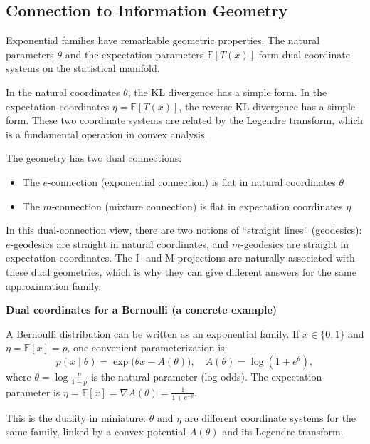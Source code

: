 \subsection{Connection to Information Geometry}

Exponential families have remarkable geometric properties. The natural parameters $\theta$ and the expectation parameters $\mathbb{E}[T(x)]$ form dual coordinate systems on the statistical manifold.

In the natural coordinates $\theta$, the KL divergence has a simple form. In the expectation coordinates $\eta = \mathbb{E}[T(x)]$, the reverse KL divergence has a simple form. These two coordinate systems are related by the Legendre transform, which is a fundamental operation in convex analysis.

\vspace{1em}

The geometry has two dual connections:

\begin{itemize}
\item The $e$-connection (exponential connection) is flat in natural coordinates $\theta$

\item The $m$-connection (mixture connection) is flat in expectation coordinates $\eta$
\end{itemize}

In this dual-connection view, there are two notions of ``straight lines'' (geodesics): $e$-geodesics are straight in natural coordinates, and $m$-geodesics are straight in expectation coordinates. The I- and M-projections are naturally associated with these dual geometries, which is why they can give different answers for the same approximation family.

\vspace{1.5em}

\begin{examplebox}
\textbf{Dual coordinates for a Bernoulli (a concrete example)}

\vspace{0.5em}

A Bernoulli distribution can be written as an exponential family. If $x\in\{0,1\}$ and $\eta=\mathbb{E}[x]=p$, one convenient parameterization is:
\begin{equation*}
p(x\mid\theta)=\exp\!\big(\theta x - A(\theta)\big),
\quad
A(\theta)=\log(1+e^\theta),
\end{equation*}
where $\theta=\log\frac{p}{1-p}$ is the natural parameter (log-odds). The expectation parameter is $\eta=\mathbb{E}[x]=\nabla A(\theta)=\frac{1}{1+e^{-\theta}}$.

\vspace{0.5em}

This is the duality in miniature: $\theta$ and $\eta$ are different coordinate systems for the same family, linked by a convex potential $A(\theta)$ and its Legendre transform.
\end{examplebox}

